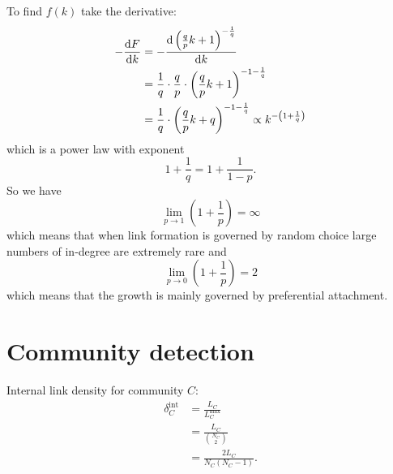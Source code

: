 \documentclass[a4paper,9pt]{extarticle}
\begin{document}
\begin{multicols*}{2}
To find $f(k)$ take the derivative:
\begin{align*}
	-\frac{\mathrm{d} F}{\mathrm{d} k}&=-\frac{\mathrm{d}\left(\frac{q}{p}k+1\right)^{-\frac{1}{q}}}{\mathrm{d} k}\\
	&=\frac{1}{q}\cdot\frac{q}{p}\cdot\left(\frac{q}{p}k+1\right)^{-1-\frac{1}{q}}\\
	&=\frac{1}{q}\cdot\left(\frac{q}{p}k+q\right)^{-1-\frac{1}{q}}\propto k^{-\left(1+\frac{1}{q}\right)}
\end{align*}
which is a power law with exponent
\begin{equation*}
	1+\frac{1}{q}=1+\frac{1}{1-p}.
\end{equation*}
So we have
\begin{equation*}
	\lim_{p\to1}\left(1+\frac{1}{p}\right)=\infty
\end{equation*}
which means that when link formation is governed by random choice large numbers of in-degree are extremely rare and
\begin{equation*}
	\lim_{p\to0}\left(1+\frac{1}{p}\right)=2
\end{equation*}
which means that the growth is mainly governed by preferential attachment.
	\section{Community detection}
	Internal link density for community $C$:
	\begin{align*}
		\delta^{\mathrm{int}}_{C}&=\frac{L_{C}}{L_{C}^{\max}}\\
		&=\frac{L_{C}}{{N_{C}\choose 2}}\\
		&=\frac{2L_{C}}{N_{C}(N_{C}-1)}.
	\end{align*}

\end{multicols*}
\end{document}
